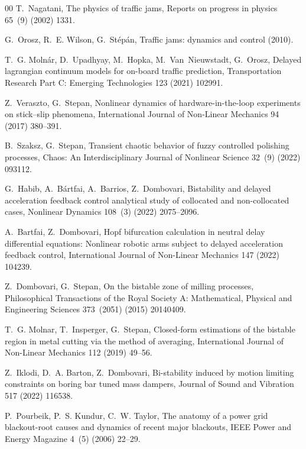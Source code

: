 \documentclass[preprint,12pt]{elsarticle}
\begin{document}
\begin{thebibliography}{00}
		T.~Nagatani, The physics of traffic jams, Reports on progress in physics 65~(9)
		(2002) 1331.
		
		G.~Orosz, R.~E. Wilson, G.~St{\'e}p{\'a}n, Traffic jams: dynamics and control
		(2010).
		
		T.~G. Moln{\'a}r, D.~Upadhyay, M.~Hopka, M.~Van~Nieuwstadt, G.~Orosz, Delayed
		lagrangian continuum models for on-board traffic prediction, Transportation
		Research Part C: Emerging Technologies 123 (2021) 102991.
		
		Z.~Veraszto, G.~Stepan, Nonlinear dynamics of hardware-in-the-loop experiments
		on stick--slip phenomena, International Journal of Non-Linear Mechanics 94
		(2017) 380--391.
		
		B.~Szaksz, G.~Stepan, Transient chaotic behavior of fuzzy controlled polishing
		processes, Chaos: An Interdisciplinary Journal of Nonlinear Science 32~(9)
		(2022) 093112.
		
		G.~Habib, A.~B{\'a}rtfai, A.~Barrios, Z.~Dombovari, Bistability and delayed
		acceleration feedback control analytical study of collocated and
		non-collocated cases, Nonlinear Dynamics 108~(3) (2022) 2075--2096.
		
		A.~Bartfai, Z.~Dombovari, Hopf bifurcation calculation in neutral delay
		differential equations: Nonlinear robotic arms subject to delayed
		acceleration feedback control, International Journal of Non-Linear Mechanics
		147 (2022) 104239.
		
		Z.~Dombovari, G.~Stepan, On the bistable zone of milling processes,
		Philosophical Transactions of the Royal Society A: Mathematical, Physical and
		Engineering Sciences 373~(2051) (2015) 20140409.
		
		T.~G. Molnar, T.~Insperger, G.~Stepan, Closed-form estimations of the bistable
		region in metal cutting via the method of averaging, International Journal of
		Non-Linear Mechanics 112 (2019) 49--56.
		
		Z.~Iklodi, D.~A. Barton, Z.~Dombovari, Bi-stability induced by motion limiting
		constraints on boring bar tuned mass dampers, Journal of Sound and Vibration
		517 (2022) 116538.
		
		P.~Pourbeik, P.~S. Kundur, C.~W. Taylor, The anatomy of a power grid
		blackout-root causes and dynamics of recent major blackouts, IEEE Power and
		Energy Magazine 4~(5) (2006) 22--29.
		

\end{thebibliography}
\end{document}
